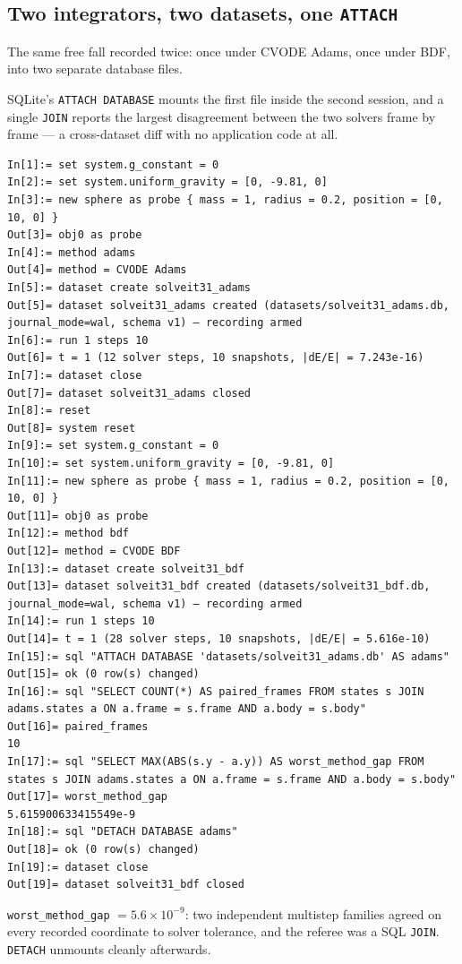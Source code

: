 \documentclass[11pt]{article}
\newcommand{\code}[1]{\texttt{#1}}
\begin{document}
\subsection{Two integrators, two datasets, one \code{ATTACH}}

The same free fall recorded twice: once under CVODE Adams, once under
BDF, into two separate database files.

SQLite's \code{ATTACH DATABASE} mounts the first file inside the
second session, and a single \code{JOIN} reports the largest
disagreement between the two solvers frame by frame --- a
cross-dataset diff with no application code at all.

\begin{lstlisting}
In[1]:= set system.g_constant = 0
In[2]:= set system.uniform_gravity = [0, -9.81, 0]
In[3]:= new sphere as probe { mass = 1, radius = 0.2, position = [0, 10, 0] }
Out[3]= obj0 as probe
In[4]:= method adams
Out[4]= method = CVODE Adams
In[5]:= dataset create solveit31_adams
Out[5]= dataset solveit31_adams created (datasets/solveit31_adams.db, journal_mode=wal, schema v1) — recording armed
In[6]:= run 1 steps 10
Out[6]= t = 1 (12 solver steps, 10 snapshots, |dE/E| = 7.243e-16)
In[7]:= dataset close
Out[7]= dataset solveit31_adams closed
In[8]:= reset
Out[8]= system reset
In[9]:= set system.g_constant = 0
In[10]:= set system.uniform_gravity = [0, -9.81, 0]
In[11]:= new sphere as probe { mass = 1, radius = 0.2, position = [0, 10, 0] }
Out[11]= obj0 as probe
In[12]:= method bdf
Out[12]= method = CVODE BDF
In[13]:= dataset create solveit31_bdf
Out[13]= dataset solveit31_bdf created (datasets/solveit31_bdf.db, journal_mode=wal, schema v1) — recording armed
In[14]:= run 1 steps 10
Out[14]= t = 1 (28 solver steps, 10 snapshots, |dE/E| = 5.616e-10)
In[15]:= sql "ATTACH DATABASE 'datasets/solveit31_adams.db' AS adams"
Out[15]= ok (0 row(s) changed)
In[16]:= sql "SELECT COUNT(*) AS paired_frames FROM states s JOIN adams.states a ON a.frame = s.frame AND a.body = s.body"
Out[16]= paired_frames
10
In[17]:= sql "SELECT MAX(ABS(s.y - a.y)) AS worst_method_gap FROM states s JOIN adams.states a ON a.frame = s.frame AND a.body = s.body"
Out[17]= worst_method_gap
5.615900633415549e-9
In[18]:= sql "DETACH DATABASE adams"
Out[18]= ok (0 row(s) changed)
In[19]:= dataset close
Out[19]= dataset solveit31_bdf closed
\end{lstlisting}

\code{worst\_method\_gap} $= 5.6\times10^{-9}$: two independent
multistep families agreed on every recorded coordinate to solver
tolerance, and the referee was a SQL \code{JOIN}. \code{DETACH}
unmounts cleanly afterwards.
\end{document}
